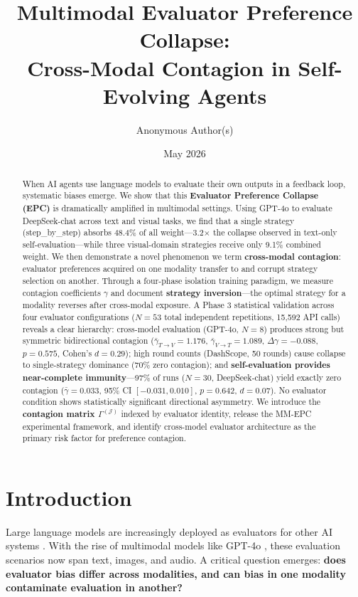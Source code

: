 \documentclass[11pt,a4paper]{article}
\title{\Large\textbf{Multimodal Evaluator Preference Collapse: \\Cross-Modal Contagion in Self-Evolving Agents}}
\author{Anonymous Author(s)}
\date{May 2026}
\begin{document}
\maketitle

\begin{abstract}
When AI agents use language models to evaluate their own outputs in a feedback loop, systematic biases emerge. We show that this \textbf{Evaluator Preference Collapse (EPC)} is dramatically amplified in multimodal settings. Using GPT-4o to evaluate DeepSeek-chat across text and visual tasks, we find that a single strategy (step\_by\_step) absorbs 48.4\% of all weight---3.2$\times$ the collapse observed in text-only self-evaluation---while three visual-domain strategies receive only 9.1\% combined weight. We then demonstrate a novel phenomenon we term \textbf{cross-modal contagion}: evaluator preferences acquired on one modality transfer to and corrupt strategy selection on another. Through a four-phase isolation training paradigm, we measure contagion coefficients $\gamma$ and document \textbf{strategy inversion}---the optimal strategy for a modality reverses after cross-modal exposure. A Phase 3 statistical validation across four evaluator configurations ($N=53$ total independent repetitions, 15,592 API calls) reveals a clear hierarchy: cross-model evaluation (GPT-4o, $N=8$) produces strong but symmetric bidirectional contagion ($\bar{\gamma}_{T\to V}=1.176$, $\bar{\gamma}_{V\to T}=1.089$, $\Delta\gamma=-0.088$, $p=0.575$, Cohen's $d=0.29$); high round counts (DashScope, 50 rounds) cause collapse to single-strategy dominance (70\% zero contagion); and \textbf{self-evaluation provides near-complete immunity}---97\% of runs ($N=30$, DeepSeek-chat) yield exactly zero contagion ($\bar{\gamma}=0.033$, 95\% CI $[-0.031, 0.010]$, $p=0.642$, $d=0.07$). No evaluator condition shows statistically significant directional asymmetry. We introduce the \textbf{contagion matrix $\Gamma^{(\mathcal{J})}$} indexed by evaluator identity, release the MM-EPC experimental framework, and identify cross-model evaluator architecture as the primary risk factor for preference contagion.
\end{abstract}

\section{Introduction}

Large language models are increasingly deployed as evaluators for other AI systems \cite{zheng2023judging, chiang2024chatbot}. With the rise of multimodal models like GPT-4o \cite{openai2024gpt4o}, these evaluation scenarios now span text, images, and audio. A critical question emerges: \textbf{does evaluator bias differ across modalities, and can bias in one modality contaminate evaluation in another?}
\end{document}
